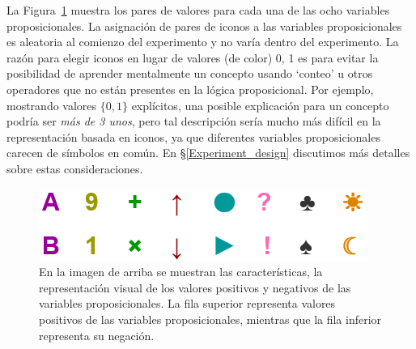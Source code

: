 La Figura~\ref{Figure:references} muestra los pares de valores para cada una de las ocho variables proposicionales. La asignación de pares de iconos a las variables proposicionales es aleatoria al comienzo del experimento y no varía dentro del experimento.
La razón para elegir iconos en lugar de valores (de color) 0, 1 es para evitar la posibilidad de aprender mentalmente un concepto usando `conteo' u otros operadores que no están presentes en la lógica proposicional. Por ejemplo, mostrando valores $ \{0,1 \} $ explícitos, una posible explicación para un concepto podría ser {\em más de 3 unos}, pero tal descripción sería mucho más difícil en la representación basada en iconos, ya que diferentes variables proposicionales carecen de símbolos en común. En \S\ref{Experiment_design} discutimos más detalles sobre estas consideraciones.

\begin{figure}[h!]
\begin{center}
    \includegraphics[scale=2]{papers/images_behavior_research_methods/Features8.png}
	\caption{
	En la imagen de arriba se muestran las características, la representación visual de los valores positivos y negativos de las variables proposicionales. La fila superior representa valores positivos de las variables proposicionales, mientras que la fila inferior representa su negación.}
	\label{Figure:references}
\end{center}
\end{figure}


